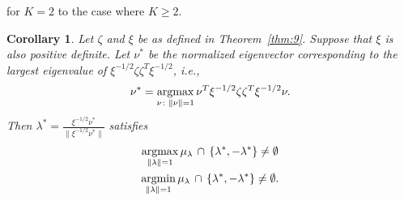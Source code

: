 \documentclass[10pt,journal,compsoc]{IEEEtran}
\newtheorem{corollary}[theorem]{Corollary}
\theoremstyle{definition}
\newcommand{\argmax}{\operatornamewithlimits{argmax}}
\newcommand{\argmin}{\operatornamewithlimits{argmin}}
\begin{document}
\cite{lee11} for $K = 2$ to the case
where $K \geq 2$. 
\begin{corollary}
  \label{cor:1}
  Let $\zeta$ and $\xi$ be as defined in Theorem~\ref{thm:9}. Suppose
  that $\xi$ is also positive definite. Let $\nu^{*}$ be the
  normalized eigenvector corresponding to the largest eigenvalue of $ \xi^{-1/2}
  \zeta \zeta^{T} \xi^{-1/2}$, i.e.,
 \begin{equation}
   \label{eq:9}
  \nu^{*} = \argmax_{\nu \colon \| \nu \| = 1}
  \nu^{T} \xi^{-1/2} \zeta \zeta^{T} \xi^{-1/2}
  \nu.
 \end{equation}
 Then $\lambda^{*} = \tfrac{\xi^{-1/2} \nu^{*}}{\|\xi^{-1/2} \nu^{*} \|}$ satisfies
 \begin{gather}
   \label{eq:8}
 \argmax_{ \|\lambda\| = 1}
 \mu_{\lambda} \, \cap \, \{\lambda^{*}, - \lambda^{*}\} \not = \emptyset \\
 \argmin_{ \| \lambda \| = 1} \mu_{\lambda} \, \cap \, \{\lambda^{*}, -
 \lambda^{*}\} \not = \emptyset.
 \end{gather}
\end{corollary}
\end{document}
